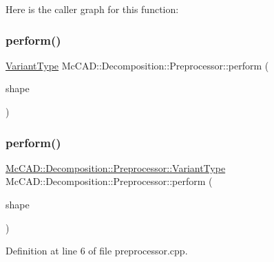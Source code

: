 Here is the caller graph for this function\+:
\mbox{\label{classMcCAD_1_1Decomposition_1_1Preprocessor_a81ce205116866f890172795c359f1dc9}} 
\subsubsection{\texorpdfstring{perform()}{perform()}\hspace{0.1cm}{\footnotesize\ttfamily [1/2]}}
{\footnotesize\ttfamily \hyperlink{classMcCAD_1_1Decomposition_1_1Preprocessor_a55fe8b69008632be9a000e551c3dfe90}{Variant\+Type} Mc\+C\+A\+D\+::\+Decomposition\+::\+Preprocessor\+::perform (\begin{DoxyParamCaption}\item[{const Topo\+D\+S\+\_\+\+Shape \&}]{shape }\end{DoxyParamCaption})}

\mbox{\label{classMcCAD_1_1Decomposition_1_1Preprocessor_af8e20922d3e63ab7efd6f559f3c978f6}} 
\subsubsection{\texorpdfstring{perform()}{perform()}\hspace{0.1cm}{\footnotesize\ttfamily [2/2]}}
{\footnotesize\ttfamily \hyperlink{classMcCAD_1_1Decomposition_1_1Preprocessor_a55fe8b69008632be9a000e551c3dfe90}{Mc\+C\+A\+D\+::\+Decomposition\+::\+Preprocessor\+::\+Variant\+Type} Mc\+C\+A\+D\+::\+Decomposition\+::\+Preprocessor\+::perform (\begin{DoxyParamCaption}\item[{const Topo\+D\+S\+\_\+\+Shape \&}]{shape }\end{DoxyParamCaption})}



Definition at line 6 of file preprocessor.\+cpp.


